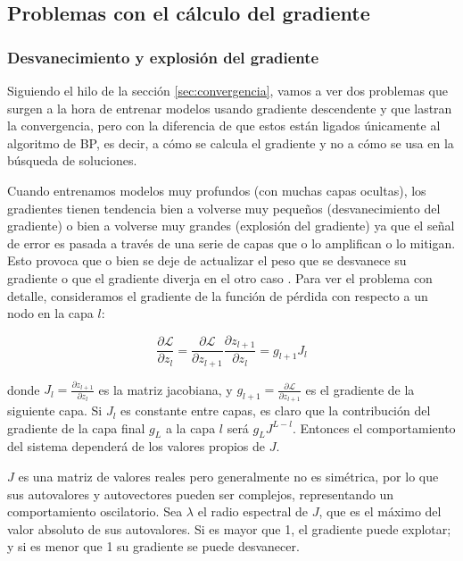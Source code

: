 \subsection{Problemas con el cálculo del gradiente}

\subsubsection{Desvanecimiento y explosión del gradiente}


Siguiendo el hilo de la sección \ref{sec:convergencia}, vamos a ver dos problemas que surgen a la hora de entrenar modelos usando gradiente descendente y que lastran la convergencia, pero con la diferencia de que estos están ligados únicamente al algoritmo de BP, es decir, a cómo se calcula el gradiente y no a cómo se usa en la búsqueda de soluciones.

Cuando entrenamos modelos muy profundos (con muchas capas ocultas), los gradientes tienen tendencia bien a volverse muy pequeños (desvanecimiento del gradiente) o bien a volverse muy grandes (explosión del gradiente) ya que el señal de error es pasada a través de una serie de capas que o lo amplifican o lo mitigan. Esto provoca que o bien se deje de actualizar el peso que se desvanece su gradiente o que el gradiente diverja en el otro caso \cite{VanishExplode}. Para ver el problema con detalle, consideramos el gradiente de la función de pérdida con respecto a un nodo en la capa $l$:

$$\frac{\partial \mathcal{L}}{\partial z_l} = \frac{\partial \mathcal{L}}{\partial z_{l+1}} \frac{\partial z_{l+1}}{\partial z_l} = g_{l+1} J_l$$

donde $J_l = \frac{\partial z_{l+1}}{\partial z_l}$ es la matriz jacobiana, y $g_{l+1} = \frac{\partial \mathcal{L}}{\partial z_{l+1}}$ es el gradiente de la siguiente capa. Si $J_l$ es constante entre capas, es claro que la contribución del gradiente de la capa final $g_L$ a la capa $l$ será $ g_L J^{L-l}$. Entonces el comportamiento del sistema dependerá de los valores propios de $J$. %

$J$ es una matriz de valores reales pero generalmente no es simétrica, por lo que sus autovalores y autovectores pueden ser complejos, representando un comportamiento oscilatorio. Sea $\lambda$ el radio espectral de $J$, que es el máximo del valor absoluto de sus autovalores. Si es mayor que 1, el gradiente puede explotar; y si es menor que 1 su gradiente se puede desvanecer. 

